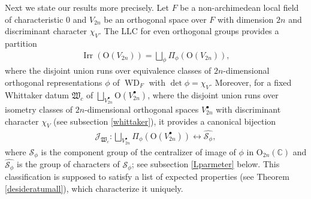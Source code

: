 \documentclass[article]{article}
\numberwithin{equation}{section}
\theoremstyle{definition}
\DeclareMathOperator{\WD}{WD}
\DeclareMathOperator{\Irr}{Irr}
\begin{document}
Next we state our results more precisely. Let $F$ be a non-archimedean local field of characteristic $0$ and $V_{2n}$ be an orthogonal space over $F$ with dimension $2n$ and discriminant character $\chi_{V}$. The LLC for even orthogonal groups provides a partition 
\begin{align}\label{1}
\Irr(\mathrm O(V_{2n})) =\bigsqcup_{\phi} \Pi_{\phi}(\mathrm O(V_{2n})),
\end{align}
where the disjoint union runs over equivalence classes of $2n$-dimensional orthogonal representations $\phi$ of $\WD_F$ with $\det \phi=\chi_{V}$. Moreover, for a fixed Whittaker datum $\mathfrak W_{c}$ of $\bigsqcup_{V_{2n}^\bullet} \mathrm O(V_{2n}^\bullet)$, where the disjoint union runs over isometry classes of $2n$-dimensional orthogonal spaces $V_{2n}^\bullet$ with discriminant character $\chi_{V}$ (see subsection \ref{whittaker}), it provides a canonical bijection 
\begin{align}\label{2}
\mathcal J_{\mathfrak W_c}: \bigsqcup_{V_{2n}^\bullet} \Pi_{\phi}(\mathrm O(V_{2n}^\bullet)) \longleftrightarrow \widehat {\mathcal {S}_{\phi}},
\end{align}
where $\mathcal {S}_{\phi}$ is the component group of the centralizer of image of $\phi$ in $\mathrm O_{2n}(\mathbb C)$ and $\widehat {\mathcal {S}_{\phi}}$ is the group of characters of $\mathcal {S}_{\phi}$; see subsection \ref{Lparmeter} below. This classification is supposed to satisfy a list of expected properties (see Theorem \ref{desideratumall}), which characterize it uniquely. 
\end{document}
